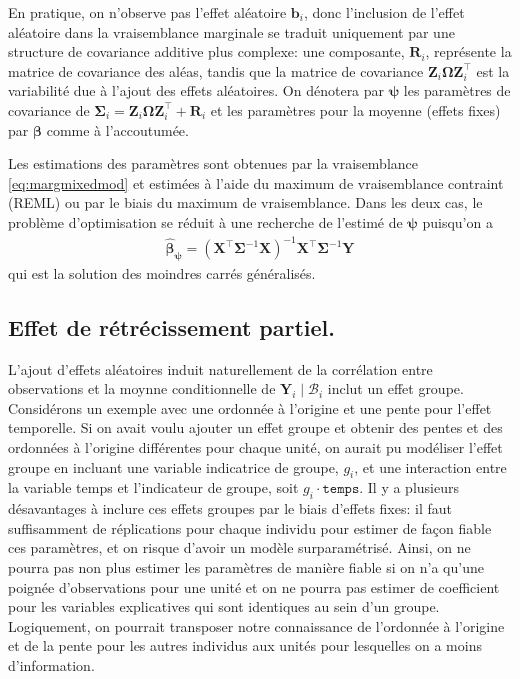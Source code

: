 \documentclass[
  11pt,
  letterpaper,
]{article}
\theoremstyle{definition}
\theoremstyle{definition}
\theoremstyle{definition}
\theoremstyle{definition}
\theoremstyle{remark}
\begin{document}
En pratique, on n'observe pas l'effet aléatoire \(\boldsymbol{b}_i\), donc l'inclusion de l'effet aléatoire dans la vraisemblance marginale se traduit uniquement par une structure de covariance additive plus complexe: une composante, \(\mathbf{R}_i\), représente la matrice de covariance des aléas, tandis que la matrice de covariance \(\mathbf{Z}_i\boldsymbol{\Omega}\mathbf{Z}_i^\top\) est la variabilité due à l'ajout des effets aléatoires. On dénotera par \(\boldsymbol{\psi}\) les paramètres de covariance de \(\boldsymbol{\Sigma}_i= \mathbf{Z}_i\boldsymbol{\Omega}\mathbf{Z}_i^\top + \mathbf{R}_i\) et les paramètres pour la moyenne (effets fixes) par \(\boldsymbol{\beta}\) comme à l'accoutumée.

Les estimations des paramètres sont obtenues par la vraisemblance \eqref{eq:margmixedmod} et estimées à l'aide du maximum de vraisemblance contraint (REML) ou par le biais du maximum de vraisemblance. Dans les deux cas, le problème d'optimisation se réduit à une recherche de l'estimé de \(\boldsymbol{\psi}\) puisqu'on a
\begin{align*}
\widehat{\boldsymbol{\beta}}_{\boldsymbol{\psi}} = (\mathbf{X}^\top\boldsymbol{\Sigma}^{-1}\mathbf{X})^{-1}\mathbf{X}^\top\boldsymbol{\Sigma}^{-1}\boldsymbol{Y}
\end{align*}
qui est la solution des moindres carrés généralisés.

\hypertarget{effet-de-ruxe9truxe9cissement-partiel.}{%
\subsection{Effet de rétrécissement partiel.}\label{effet-de-ruxe9truxe9cissement-partiel.}}

L'ajout d'effets aléatoires induit naturellement de la corrélation entre observations et la moynne conditionnelle de \(\boldsymbol{Y}_i \mid \mathcal{B}_i\) inclut un effet groupe. Considérons un exemple avec une ordonnée à l'origine et une pente pour l'effet temporelle. Si on avait voulu ajouter un effet groupe et obtenir des pentes et des ordonnées à l'origine différentes pour chaque unité, on aurait pu modéliser l'effet groupe en incluant une variable indicatrice de groupe, \(g_i\), et une interaction entre la variable temps et l'indicateur de groupe, soit \(g_i\cdot \texttt{temps}\). Il y a plusieurs désavantages à inclure ces effets groupes par le biais d'effets fixes: il faut suffisamment de réplications pour chaque individu pour estimer de façon fiable ces paramètres, et on risque d'avoir un modèle surparamétrisé. Ainsi, on ne pourra pas non plus estimer les paramètres de manière fiable si on n'a qu'une poignée d'observations pour une unité et on ne pourra pas estimer de coefficient pour les variables explicatives qui sont identiques au sein d'un groupe. Logiquement, on pourrait transposer notre connaissance de l'ordonnée à l'origine et de la pente pour les autres individus aux unités pour lesquelles on a moins d'information.
\end{document}
